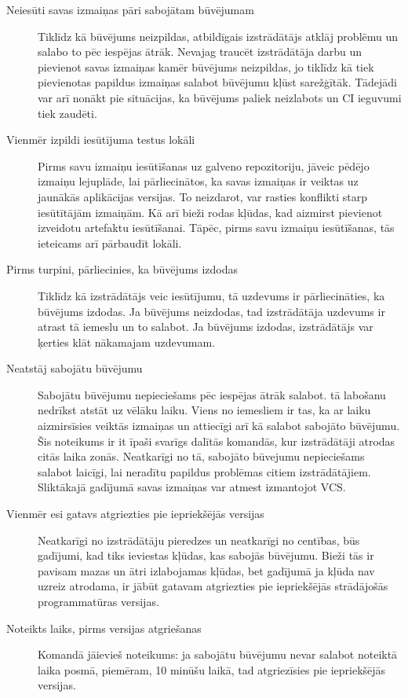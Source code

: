 \begin{description}
	\item [Neiesūti savas izmaiņas pāri sabojātam būvējumam] Tiklīdz kā būvējums neizpildas, atbildīgais izstrādātājs atklāj problēmu un salabo to pēc iespējas ātrāk. Nevajag traucēt izstrādātāja darbu un pievienot savas izmaiņas kamēr būvējums neizpildas, jo tiklīdz kā tiek pievienotas papildus izmaiņas salabot būvējumu kļūst sarežģītāk. Tādejādi var arī nonākt pie situācijas, ka būvējums paliek neizlabots un CI ieguvumi tiek zaudēti.
	\item [Vienmēr izpildi iesūtījuma testus lokāli] Pirms savu izmaiņu iesūtīšanas uz galveno repozitoriju, jāveic pēdējo izmaiņu lejuplāde, lai pārliecinātos, ka savas izmaiņas ir veiktas uz jaunākās aplikācijas versijas. To neizdarot, var rasties konflikti starp iesūtītājām izmaiņām. Kā arī bieži rodas kļūdas, kad aizmirst pievienot izveidotu artefaktu iesūtīšanai. Tāpēc, pirms savu izmaiņu iesūtīšanas, tās ieteicams arī pārbaudīt lokāli.
	\item [Pirms turpini, pārliecinies, ka būvējums izdodas] Tiklīdz kā izstrādātājs veic iesūtījumu, tā uzdevums ir pārliecināties, ka būvējums izdodas. Ja būvējums neizdodas, tad izstrādātāja uzdevums ir atrast tā iemeslu un to salabot. Ja būvējums izdodas, izstrādātājs var ķerties klāt nākamajam uzdevumam.
	\item [Neatstāj sabojātu būvējumu] Sabojātu būvējumu nepieciešams pēc iespējas ātrāk salabot. tā labošanu nedrīkst atstāt uz vēlāku laiku. Viens no iemesliem ir tas, ka ar laiku aizmirsīsies veiktās izmaiņas un attiecīgi arī kā salabot sabojāto būvējumu. Šis noteikums ir it īpaši svarīgs dalītās komandās, kur izstrādātāji atrodas citās laika zonās. Neatkarīgi no tā, sabojāto būvejumu nepieciešams salabot laicīgi, lai neradītu papildus problēmas citiem izstrādātājiem. Sliktākajā gadījumā savas izmaiņas var atmest izmantojot VCS.
	\item [Vienmēr esi gatavs atgriezties pie iepriekšējās versijas] Neatkarīgi no izstrādātāju pieredzes un neatkarīgi no centības, būs gadījumi, kad tiks ieviestas kļūdas, kas sabojās būvējumu. Bieži tās ir pavisam mazas un ātri izlabojamas kļūdas, bet gadījumā ja kļūda nav uzreiz atrodama, ir jābūt gatavam atgriezties pie iepriekšējās strādājošās programmatūras versijas.
	\item [Noteikts laiks, pirms versijas atgriešanas] Komandā jāievieš noteikums: ja sabojātu būvējumu nevar salabot noteiktā laika posmā, piemēram, 10 minūšu laikā, tad atgriezīsies pie iepriekšējās versijas.

\end{description}
